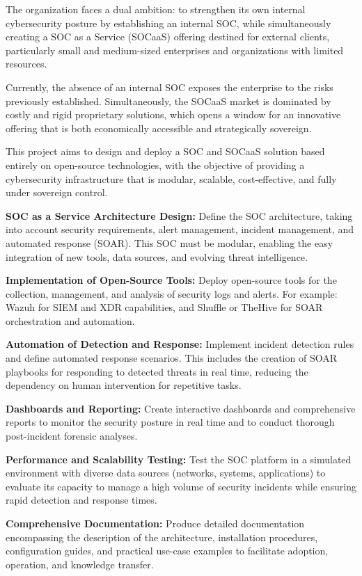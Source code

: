The organization faces a dual ambition: to strengthen its own internal cybersecurity posture by establishing an internal SOC, while simultaneously creating a SOC as a Service (SOCaaS) offering destined for external clients, particularly small and medium-sized enterprises and organizations with limited resources.

Currently, the absence of an internal SOC exposes the enterprise to the risks previously established. Simultaneously, the SOCaaS market is dominated by costly and rigid proprietary solutions, which opens a window for an innovative offering that is both economically accessible and strategically sovereign.

This project aims to design and deploy a SOC and SOCaaS solution based entirely on open-source technologies, with the objective of providing a cybersecurity infrastructure that is modular, scalable, cost-effective, and fully under sovereign control.

\textbf{SOC as a Service Architecture Design:} Define the SOC architecture, taking into account security requirements, alert management, incident management, and automated response (SOAR). This SOC must be modular, enabling the easy integration of new tools, data sources, and evolving threat intelligence.

\textbf{Implementation of Open-Source Tools:} Deploy open-source tools for the collection, management, and analysis of security logs and alerts. For example: Wazuh for SIEM and XDR capabilities, and Shuffle or TheHive for SOAR orchestration and automation.

\textbf{Automation of Detection and Response:} Implement incident detection rules and define automated response scenarios. This includes the creation of SOAR playbooks for responding to detected threats in real time, reducing the dependency on human intervention for repetitive tasks.

\textbf{Dashboards and Reporting:} Create interactive dashboards and comprehensive reports to monitor the security posture in real time and to conduct thorough post-incident forensic analyses.

\textbf{Performance and Scalability Testing:} Test the SOC platform in a simulated environment with diverse data sources (networks, systems, applications) to evaluate its capacity to manage a high volume of security incidents while ensuring rapid detection and response times.

\textbf{Comprehensive Documentation:} Produce detailed documentation encompassing the description of the architecture, installation procedures, configuration guides, and practical use-case examples to facilitate adoption, operation, and knowledge transfer.

